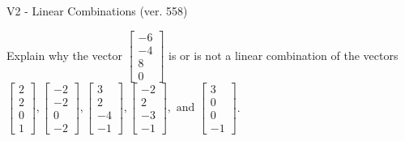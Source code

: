 \begin{exercise}
  \begin{exerciseTitle}V2 - Linear Combinations (ver. 558)\end{exerciseTitle}
  \begin{exerciseStatement}
    Explain why the vector \(\left[\begin{array}{c}
-6 \\
-4 \\
8 \\
0
\end{array}\right]\)  is or is not a linear 
	combination of the vectors \(\left[\begin{array}{c}
2 \\
2 \\
0 \\
1
\end{array}\right] , \left[\begin{array}{c}
-2 \\
-2 \\
0 \\
-2
\end{array}\right] , \left[\begin{array}{c}
3 \\
2 \\
-4 \\
-1
\end{array}\right] , \left[\begin{array}{c}
-2 \\
2 \\
-3 \\
-1
\end{array}\right] , \text{ and } \left[\begin{array}{c}
3 \\
0 \\
0 \\
-1
\end{array}\right]\).
	



\end{exerciseStatement}
\end{exercise}
